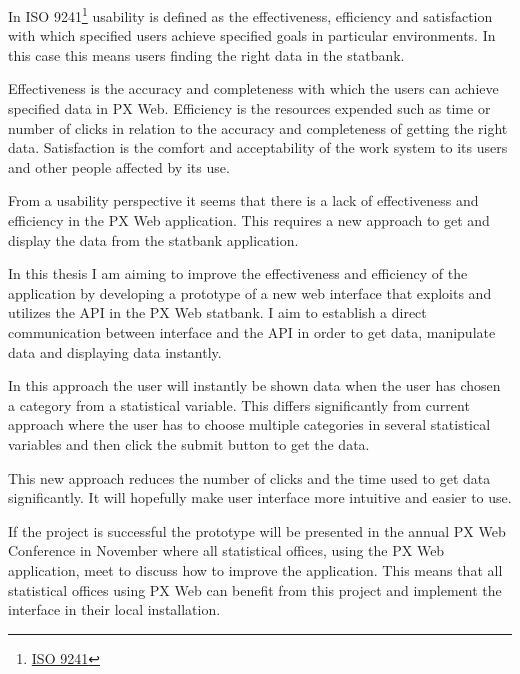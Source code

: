 In ISO 9241\footnote{\href{https://www.iso.org/search.html?q=ISO\%209241}{ISO 9241}\label{iso9241}} usability is defined as the effectiveness, efficiency and satisfaction with which specified users achieve specified goals in particular environments. In this case this means users finding the right data in the statbank.
 
Effectiveness is the accuracy and completeness with which the users can achieve specified data in PX Web.  Efficiency is the resources expended such as time or number of clicks in relation to the accuracy and completeness of getting the right data. Satisfaction is the comfort and acceptability of the work system to its users and other people affected by its use.

From a usability perspective it seems that there is a lack of effectiveness and efficiency in the PX Web application. This requires a new approach to get and display the data from the statbank application.
 
In this thesis I am aiming to improve the effectiveness and efficiency of the application by developing a prototype of a new web interface that exploits and utilizes the API in the PX Web statbank. I aim to establish a direct communication between interface and the API in order to get data, manipulate data and displaying data instantly.

In this approach the user will instantly be shown data when the user has chosen a category from a statistical variable. This differs significantly from current approach where the user has to choose multiple categories in several statistical variables and then click the submit button to get the data. 

This new approach reduces the number of clicks and the time used to get data significantly.
It will hopefully make user interface more intuitive and easier to use.
 
If the project is successful the prototype will be presented in the annual PX Web Conference in November where all statistical offices, using the PX Web application, meet to discuss how to improve the application. This means that all statistical offices using PX Web can benefit from this project and implement the interface in their local installation.

